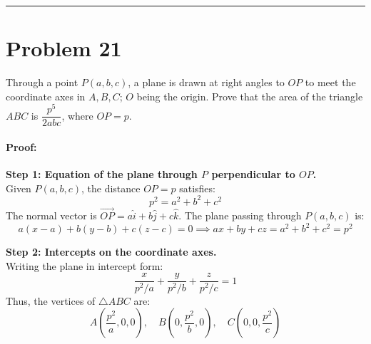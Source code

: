 \documentclass[11pt,a4paper]{article}
\begin{document}
\vspace{0.4cm}
\hrule
\vspace{0.4cm}

\section{Problem 21}
\begin{problembox}[Problem 21]
Through a point $P(a, b, c)$, a plane is drawn at right angles to $OP$ to meet the coordinate axes in $A, B, C$; $O$ being the origin. Prove that the area of the triangle $ABC$ is $\dfrac{p^5}{2abc}$, where $OP = p$.
\end{problembox}

\paragraph{Proof:}
\textbf{Step 1: Equation of the plane through $P$ perpendicular to $OP$.}\\
Given $P(a, b, c)$, the distance $OP = p$ satisfies:
$$p^2 = a^2 + b^2 + c^2$$
The normal vector is $\vec{OP} = a\hat{i} + b\hat{j} + c\hat{k}$. The plane passing through $P(a, b, c)$ is:
$$a(x - a) + b(y - b) + c(z - c) = 0 \implies ax + by + cz = a^2 + b^2 + c^2 = p^2$$

\textbf{Step 2: Intercepts on the coordinate axes.}\\
Writing the plane in intercept form:
$$\frac{x}{p^2/a} + \frac{y}{p^2/b} + \frac{z}{p^2/c} = 1$$
Thus, the vertices of $\triangle ABC$ are:
$$A\left(\frac{p^2}{a}, 0, 0\right), \quad B\left(0, \frac{p^2}{b}, 0\right), \quad C\left(0, 0, \frac{p^2}{c}\right)$$
\end{document}
